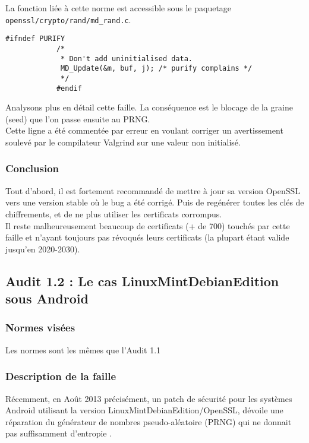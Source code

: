 			La fonction liée à cette norme est accessible sous le paquetage 
			\texttt{openssl/crypto/rand/md\_rand.c}.
			
			
			\begin{lstlisting}[style=customc,caption=md\_rand.c, label=mdrand]
			#ifndef PURIFY
			/*
			 * Don't add uninitialised data.
			 MD_Update(&m, buf, j); /* purify complains */
			 */
			#endif
			\end{lstlisting}
			
			Analysons plus en détail cette faille. 
			La conséquence est le blocage de la graine (seed) que l'on 
			passe ensuite au PRNG.\\
		
			Cette ligne a été commentée par erreur en voulant corriger un
			avertissement soulevé par le compilateur Valgrind sur une valeur
			non initialisé.\\

		\subsubsection{Conclusion}
		
			Tout d'abord, il est fortement recommandé de mettre à jour sa
			version OpenSSL vers une version stable où le bug a été corrigé.
			Puis de regénérer toutes les clés de chiffrements, et de ne plus
			utiliser les certificats corrompus.\\
			Il reste malheureusement beaucoup de certificats (+ de 700) 
			touchés par cette faille et n'ayant toujours pas révoqués leurs
			certificats (la plupart étant valide jusqu'en 2020-2030).
			
	\subsection{Audit 1.2 : Le cas LinuxMintDebianEdition sous Android}
		\subsubsection{Normes visées}
	
			Les normes sont les mêmes que l'Audit 1.1
		
		\subsubsection{Description de la faille}
		
			Récemment, en Août 2013 précisément, un patch de sécurité pour les 
			systèmes Android utilisant la version LinuxMintDebianEdition/OpenSSL, 
			dévoile une réparation du générateur de nombres pseudo-aléatoire (PRNG) 
			qui ne donnait pas suffisamment d'entropie
			\cite{alex2013android} \cite{bochum2013randomly}. \\
			
